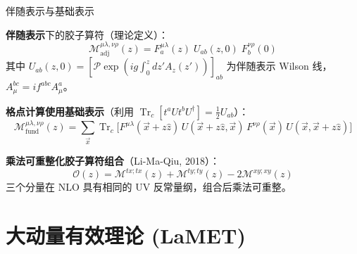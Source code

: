 \documentclass[10pt,aspectratio=169]{beamer}
\newcommand{\trc}{\operatorname{Tr}_c}
\begin{document}
\begin{frame}{伴随表示与基础表示}
{\small
\textbf{伴随表示}下的胶子算符（理论定义）：
\begin{equation*}
  \mathcal{M}^{\mu\lambda,\nu\rho}_{\text{adj}}(z) = F^{\mu\lambda}_a(z)\;U_{ab}(z,0)\;F^{\nu\rho}_b(0)
\end{equation*}
其中 $U_{ab}(z,0) = [\mathcal{P}\exp(ig\int_0^z dz' A_z(z'))]_{ab}$ 为伴随表示 Wilson 线，
$A^{bc}_\mu = i f^{abc} A^a_\mu$。

\textbf{格点计算使用基础表示}（利用 $\trc[t^a U t^b U^\dagger] = \frac{1}{2}U_{ab}$）：
\begin{equation}
  \boxed{
  \mathcal{M}^{\mu\lambda,\nu\rho}_{\text{fund}}(z) = \sum_{\vec{x}}
  \trc\!\Big[F^{\mu\lambda}(\vec{x}+z\hat{z})\,
  U(\vec{x}+z\hat{z}, \vec{x})\,
  F^{\nu\rho}(\vec{x})\,
  U(\vec{x}, \vec{x}+z\hat{z})\Big]
  }
\end{equation}

\textbf{乘法可重整化胶子算符组合}（Li-Ma-Qiu, 2018）：
\begin{equation}
  \boxed{
  \mathcal{O}(z) = \mathcal{M}^{tx;tx}(z) + \mathcal{M}^{ty;ty}(z) - 2\mathcal{M}^{xy;xy}(z)
  }
\end{equation}
三个分量在 NLO 具有相同的 UV 反常量纲，组合后乘法可重整。
}
\end{frame}

\section{大动量有效理论 (LaMET)}
\end{document}
